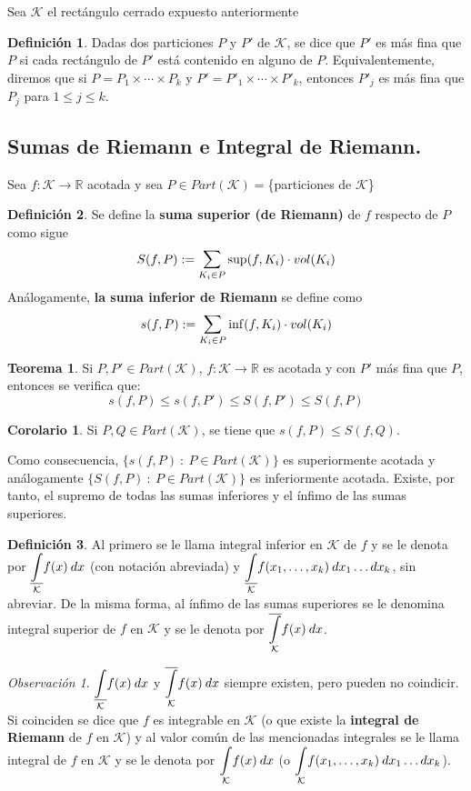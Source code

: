 \documentclass[12pt,twoside]{report}
\newcommand\mc[1]{\mathcal{#1}}
\theoremstyle{azul}
\theoremstyle{azul2}
\theoremstyle{plain}
\theoremstyle{definition}
\newtheorem{defin}{Definición}[chapter]
\newtheorem{teo}{Teorema}[chapter]
\newtheorem*{cor}{Corolario}
\theoremstyle{remark}
\newtheorem*{obs}{Observación}
\begin{document}
Sea $\mc{K}$ el rectángulo cerrado expuesto anteriormente
\begin{defin}
Dadas dos particiones $P$ y $P'$ de $\mc{K}$, se dice que $P'$ es más fina que $P$ si cada rectángulo de $P'$ está contenido en alguno de $P$. Equivalentemente, diremos que si $P=P_1 \times \cdots \times P_k$ y $P'=P'_1 \times \cdots \times P'_k$, entonces $P'_j$ es más fina que $P_j$ para $1 \leq j \leq k$.
\end{defin}
\subsection{Sumas de Riemann e Integral de Riemann.}
Sea $f: \mc{K} \longrightarrow \mathbb{R}$ acotada y sea $P \in Part(\mc{K})=$\{particiones de $\mc{K}$\}
\begin{defin}
Se define la \textbf{suma superior (de Riemann)} de $f$ respecto de $P$ como sigue $$S(f,P) := \underset{K_i \in P}{\mathlarger{\sum}} \sup(f,K_i) \cdot vol(K_i)$$ Análogamente, \textbf{la suma inferior de Riemann} se define como $$s(f,P) := \underset{K_i \in P}{\mathlarger{\sum}} \inf(f,K_i) \cdot vol(K_i)$$
\end{defin} 
\begin{teo}
Si $P,P' \in Part(\mc{K})$, $f: \mc{K} \longrightarrow \mathbb{R}$ es acotada y con $P'$ más fina que $P$, entonces se verifica que:
$$s(f,P) \leq s(f,P') \leq S(f,P') \leq S(f,P)$$
\end{teo}
\begin{cor}
Si $P,Q \in Part(\mc{K})$, se tiene que $s(f,P) \leq S(f,Q)$. 

Como consecuencia, $\{s(f,P) \: : \: P \in Part(\mc{K})\}$ es superiormente acotada y análogamente $\{S(f,P) \: : \: P \in Part(\mc{K})\}$ es inferiormente acotada. Existe, por tanto, el supremo de todas las sumas inferiores y el ínfimo de las sumas superiores. 
\end{cor}
\begin{defin}
Al primero se le llama integral inferior en $\mc{K}$ de $f$ y se le denota por $\underset{\mc{K}}{\underline{\mathlarger{\int}}} f(x) \: dx$ (con notación abreviada) y $\underset{\mc{K}}{\underline{\mathlarger{\int}}} f(x_1,\ldots,x_k) \: dx_1 \ldots dx_k$\;, sin abreviar. De la misma forma, al ínfimo de las sumas superiores se le denomina integral superior de $f$ en $\mc{K}$ y se le denota por $\underset{\mc{K}}{\overline{\mathlarger{\int}}} f(x) \: dx$.
\end{defin}

\begin{obs}
$\underset{\mc{K}}{\underline{\mathlarger{\int}}} f(x) \: dx$ y $\underset{\mc{K}}{\overline{\mathlarger{\int}}} f(x) \: dx$ siempre existen, pero pueden no coindicir. Si coinciden se dice que $f$ es integrable en $\mc{K}$ (o que existe la \textbf{integral de Riemann} de $f$ en $\mc{K}$) y al valor común de las mencionadas integrales se le llama integral de $f$ en $\mc{K}$ y se le denota por $\underset{\mc{K}}{\mathlarger{\int}} f(x) \: dx$ (o $\underset{\mc{K}}{\mathlarger{\int}} f(x_1,\ldots,x_k) \: dx_1 \ldots dx_k$).
\end{obs}
\end{document}
